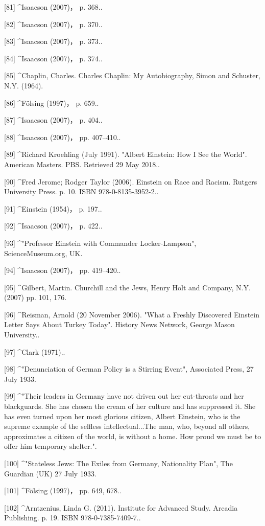 [81]
^Isaacson (2007)， p. 368..

[82]
^Isaacson (2007)， p. 370..

[83]
^Isaacson (2007)， p. 373..

[84]
^Isaacson (2007)， p. 374..

[85]
^Chaplin, Charles. Charles Chaplin: My Autobiography, Simon and Schuster, N.Y. (1964).

[86]
^Fölsing (1997)， p. 659..

[87]
^Isaacson (2007)， p. 404..

[88]
^Isaacson (2007)， pp. 407–410..

[89]
^Richard Kroehling (July 1991). "Albert Einstein: How I See the World". American Masters. PBS. Retrieved 29 May 2018..

[90]
^Fred Jerome; Rodger Taylor (2006). Einstein on Race and Racism. Rutgers University Press. p. 10. ISBN 978-0-8135-3952-2..

[91]
^Einstein (1954)， p. 197..

[92]
^Isaacson (2007)， p. 422..

[93]
^"Professor Einstein with Commander Locker-Lampson", ScienceMuseum.org, UK.

[94]
^Isaacson (2007)， pp. 419–420..

[95]
^Gilbert, Martin. Churchill and the Jews, Henry Holt and Company, N.Y. (2007) pp. 101, 176.

[96]
^Reisman, Arnold (20 November 2006). "What a Freshly Discovered Einstein Letter Says About Turkey Today". History News Network, George Mason University..

[97]
^Clark (1971)..

[98]
^"Denunciation of German Policy is a Stirring Event", Associated Press, 27 July 1933.

[99]
^"Their leaders in Germany have not driven out her cut-throats and her blackguards. She has chosen the cream of her culture and has suppressed it. She has even turned upon her most glorious citizen, Albert Einstein, who is the supreme example of the selfless intellectual...The man, who, beyond all others, approximates a citizen of the world, is without a home. How proud we must be to offer him temporary shelter.".

[100]
^"Stateless Jews: The Exiles from Germany, Nationality Plan", The Guardian (UK) 27 July 1933.

[101]
^Fölsing (1997)， pp. 649, 678..

[102]
^Arntzenius, Linda G. (2011). Institute for Advanced Study. Arcadia Publishing. p. 19. ISBN 978-0-7385-7409-7..

